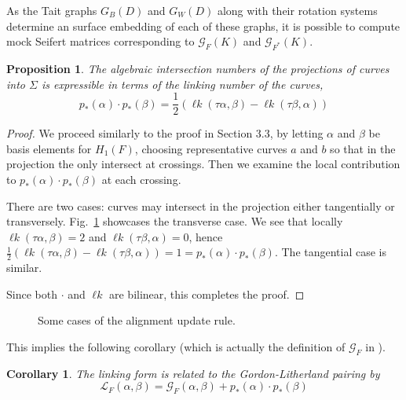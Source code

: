 \documentclass[12pt]{report}
\newcommand{\lk}{\operatorname{\ell\textit{k}}}
\newtheorem*{proposition}{Proposition}
\newtheorem*{corollary}{Corollary}
\theoremstyle{upright}
\begin{document}
As the Tait graphs $G_{B}(D)$ and $G_{W}(D)$ along with their rotation systems determine an surface embedding of each of these graphs, it is possible to compute mock Seifert matrices corresponding to $\mathcal{G}_{F}(K)$ and $\mathcal{G}_{F^{*}}(K)$.

\begin{proposition}
	The algebraic intersection numbers of the projections of curves into $\Sigma$ is expressible in terms of the linking number of the curves,
	\[p_{*}(\alpha) \cdot p_{*}(\beta) = \dfrac{1}{2}\left(\lk(\tau \alpha, \beta) - \lk(\tau \beta, \alpha)\right)\]
\end{proposition}

\begin{proof}
	We proceed similarly to the proof in Section 3.3, by letting $\alpha$ and $\beta$ be basis elements for $H_{1}(F)$, choosing representative curves $a$ and $b$ so that in the projection the only intersect at crossings. Then we examine the local contribution to $p_{*}(\alpha) \cdot p_{*}(\beta)$ at each crossing.
	
	There are two cases: curves may intersect in the projection either tangentially or transversely. Fig.~\ref{fig:intersection-number-example} showcases the transverse case. We see that locally $\lk(\tau\alpha, \beta) = 2$ and $\lk(\tau\beta, \alpha) = 0$, hence $\frac{1}{2}(\lk(\tau\alpha, \beta) - \lk(\tau\beta, \alpha)) = 1 = p_{*}(\alpha) \cdot p_{*}(\beta)$. The tangential case is similar.
	
	Since both $\cdot$ and $\lk$ are bilinear, this completes the proof.
\end{proof}

\begin{figure}[hbt!]
	\centering
	\def\svgscale{0.54}
	
	
	\caption{Some cases of the alignment update rule.}
	\label{fig:intersection-number-example}
\end{figure}

This implies the following corollary (which is actually the definition of $\mathcal{G}_{F}$ in \cite{gordon-litherland-pairing-thickened-surfaces}).

\begin{corollary}
The linking form is related to the Gordon-Litherland pairing by
\[\mathcal{L}_{F}(\alpha, \beta) = \mathcal{G}_{F}(\alpha, \beta) + p_{*}(\alpha) \cdot p_{*}(\beta)\]
\end{corollary}
\end{document}
